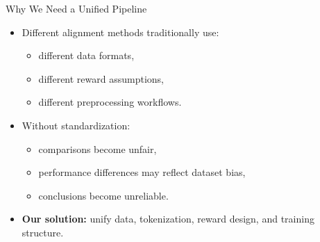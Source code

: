 \documentclass[10pt]{beamer}
\begin{document}
\begin{frame}{Why We Need a Unified Pipeline}
\large

\begin{itemize}
    \item<1-> Different alignment methods traditionally use:
    \begin{itemize}
        \item different data formats,
        \item different reward assumptions,
        \item different preprocessing workflows.
    \end{itemize}

    \vspace{0.35cm}

    \item<2-> Without standardization:
    \begin{itemize}
        \item comparisons become unfair,
        \item performance differences may reflect dataset bias,
        \item conclusions become unreliable.
    \end{itemize}

    \vspace{0.35cm}

    \item<3-> \textbf{Our solution:} unify data, tokenization, reward design, and training structure.
\end{itemize}

\end{frame}
\end{document}
